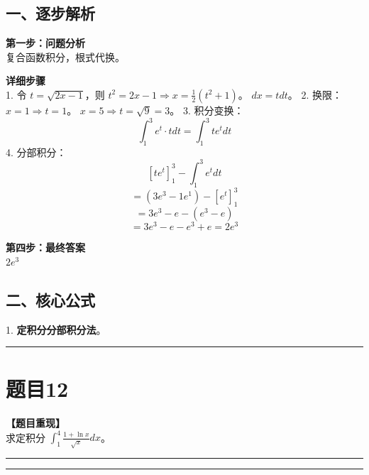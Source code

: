 \documentclass[12pt, a4paper]{ctexart}
\newcommand{\TopSeparator}{
    \par\noindent\rule{\textwidth}{1.5pt}\vspace{0.5em} %
}
\newcommand{\AnalysisSeparator}{
    \par\noindent\rule{\textwidth}{0.5pt}\vspace{0.2em}\hrule\vspace{0.5em} %
}
\newenvironment{RedAnalysis}{
    \par
    \color{red} %
}{
    \par
    \color{black} %
}
\begin{document}
\begin{RedAnalysis}

\subsection*{一、逐步解析}

\textbf{第一步：问题分析} \\
复合函数积分，根式代换。

\textbf{详细步骤} \\
1. 令 $t = \sqrt{2x-1}$，则 $t^2 = 2x-1 \Rightarrow x = \frac{1}{2}(t^2+1)$。
   $dx = t dt$。
2. 换限：
   $x=1 \Rightarrow t=1$。
   $x=5 \Rightarrow t=\sqrt{9}=3$。
3. 积分变换：
   \[ \int_1^3 e^t \cdot t dt = \int_1^3 t e^t dt \]
4. 分部积分：
   \[ [t e^t]_1^3 - \int_1^3 e^t dt \]
   \[ = (3e^3 - 1e^1) - [e^t]_1^3 \]
   \[ = 3e^3 - e - (e^3 - e) \]
   \[ = 3e^3 - e - e^3 + e = 2e^3 \]

\textbf{第四步：最终答案} \\
$ 2e^3 $

\subsection*{二、核心公式}
1. \textbf{定积分分部积分法}。

\end{RedAnalysis}

\vspace{2em}

\TopSeparator
\section*{题目12}

\textbf{【题目重现】} \\
求定积分 $ \int_{1}^{4}\frac{1+\ln x}{\sqrt{x}}dx $。

\AnalysisSeparator
\end{document}

